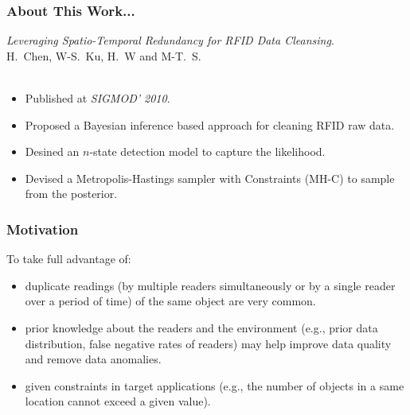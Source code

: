 \begin{frame}
\frametitle{About This Work...}

\emph{Leveraging Spatio-Temporal Redundancy for RFID Data Cleansing}.~\cite{chen2010leveraging} \\
H.~Chen, W-S.~Ku, H.~W and M-T.~S.\\~\\

\begin{itemize}
  \item Published at \emph{SIGMOD' 2010}.
  \item Proposed a Bayesian inference based approach for cleaning RFID raw data.
  \item Desined an $n$-state detection model to capture the likelihood.
  \item Devised a Metropolis-Hastings sampler with Constraints (MH-C) to sample from the posterior.
\end{itemize}

\end{frame}


\begin{frame}
\frametitle{Motivation}

To take full advantage of:

\begin{itemize}
  \item duplicate readings (by multiple readers simultaneously or by a single reader over a period of time) of the same object are very common.
  \item prior knowledge about the readers and the environment (e.g., prior data distribution, false negative rates of readers) may help improve data quality and remove data anomalies.
  \item given constraints in target applications (e.g., the number of objects in a same location cannot exceed a given value).
\end{itemize}

\end{frame}


